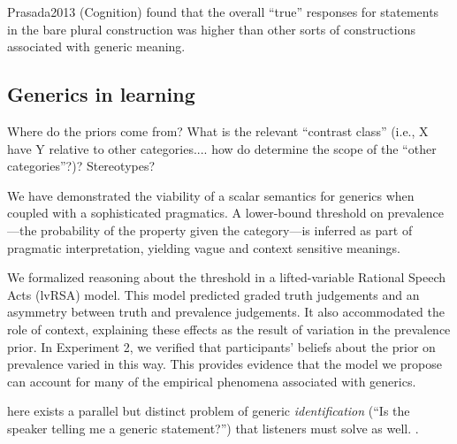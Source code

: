 \documentclass[10pt,letterpaper]{article}
\begin{document}
Prasada2013 (Cognition) found that the overall ``true'' responses for statements in the bare plural construction was higher than other sorts of constructions associated with generic meaning.

\subsection{Generics in learning}

Where do the priors come from? What is the relevant ``contrast class'' (i.e., X have Y relative to other categories.... how do determine the scope of the ``other categories''?)? Stereotypes?
 
 
 

We have demonstrated the viability of a scalar semantics for generics when coupled with a sophisticated pragmatics. 
A lower-bound threshold on prevalence---the probability of the property given the category---is inferred as part of pragmatic interpretation, yielding vague and context sensitive meanings. 
%

%
We formalized reasoning about the threshold in a lifted-variable Rational Speech Acts (lvRSA) model. This model predicted graded truth judgements and an asymmetry between truth and prevalence judgements. It also accommodated the role of context, explaining these effects as the result of variation in the prevalence prior. 
In Experiment 2, we verified that participants' beliefs about the prior on prevalence varied in this way. 
This provides evidence that the model we propose can account for many of the empirical phenomena associated with generics.


here exists a parallel but distinct problem of generic \emph{identification} (``Is the speaker telling me a generic statement?'') \cite{Cimpian2008} that listeners must solve as well. . 
\end{document}
